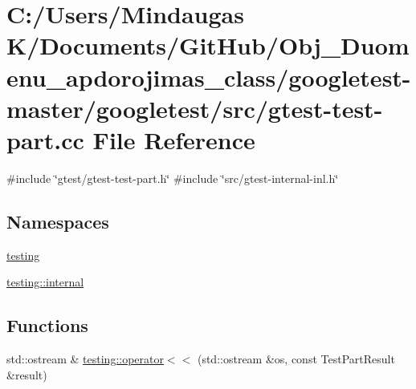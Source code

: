 \hypertarget{googletest-master_2googletest_2src_2gtest-test-part_8cc}{}\section{C\+:/\+Users/\+Mindaugas K/\+Documents/\+Git\+Hub/\+Obj\+\_\+\+Duomenu\+\_\+apdorojimas\+\_\+class/googletest-\/master/googletest/src/gtest-\/test-\/part.cc File Reference}
\label{googletest-master_2googletest_2src_2gtest-test-part_8cc}
{\ttfamily \#include \char`\"{}gtest/gtest-\/test-\/part.\+h\char`\"{}}\newline
{\ttfamily \#include \char`\"{}src/gtest-\/internal-\/inl.\+h\char`\"{}}\newline
\subsection*{Namespaces}
\begin{DoxyCompactItemize}
\item 
 \mbox{\hyperlink{namespacetesting}{testing}}
\item 
 \mbox{\hyperlink{namespacetesting_1_1internal}{testing\+::internal}}
\end{DoxyCompactItemize}
\subsection*{Functions}
\begin{DoxyCompactItemize}
\item 
std\+::ostream \& \mbox{\hyperlink{namespacetesting_a7c88897836b9f492190fb2b9dfa3a327}{testing\+::operator$<$$<$}} (std\+::ostream \&os, const Test\+Part\+Result \&result)
\end{DoxyCompactItemize}
